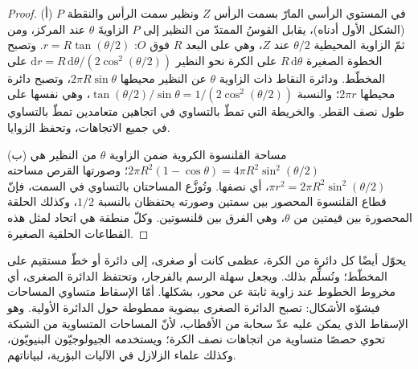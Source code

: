 \begin{proof}
(أ) في المستوي الرأسي المارّ بسمت الرأس $Z$ ونظير سمت الرأس والنقطة $P$
(الشكل الأول أدناه)، يقابل القوسُ الممتدّ من النظير إلى $P$ الزاويةَ $\theta$ عند المركز،
ومن ثمّ الزاوية المحيطية
$\theta/2$ عند $Z$، وهي على البعد $R$ فوق $O$: $r =
R\tan(\theta/2)$. وتصبح الخطوة الصغيرة $R\,\mathrm d\theta$ على الكرة نحو
النظير $\mathrm dr = R\,\mathrm d\theta/(2\cos^2(\theta/2))$ على
المخطّط. ودائرة النقاط ذات الزاوية $\theta$ عن النظير
محيطها $2\pi R\sin\theta$، وتصبح دائرة محيطها $2\pi
r$؛ والنسبة $\tan(\theta/2)/\sin\theta = 1/(2\cos^2(\theta/2))$، وهي نفسها
على طول نصف القطر. والخريطة التي تمطّ بالتساوي في اتجاهين متعامدين
تمطّ بالتساوي في جميع الاتجاهات، وتحفظ الزوايا.

(ب) مساحة القلنسوة الكروية ضمن الزاوية $\theta$ من النظير هي
$2\pi R^2(1 - \cos\theta) = 4\pi R^2\sin^2(\theta/2)$؛ وصورتها القرص
مساحته $\pi r^2 = 2\pi R^2\sin^2(\theta/2)$، أي نصفها. وتُوزَّع المساحتان
بالتساوي في السمت، فإنّ قطاع القلنسوة المحصور بين سمتين
وصورته يحتفظان بالنسبة $1/2$، وكذلك الحلقة المحصورة بين قيمتين
من $\theta$، وهي الفرق بين قلنسوتين. وكلّ منطقة هي اتحاد لمثل
هذه القطاعات الحلقية الصغيرة.
\end{proof}

يحوّل  أيضًا كل دائرة من الكرة، عظمى كانت أو صغرى،
إلى دائرة أو خطّ مستقيم على المخطّط؛ ونُسلِّم بذلك. ويجعل
 سهلة الرسم بالفرجار، وتحتفظ الدائرة الصغرى، أي مخروط
الخطوط عند زاوية ثابتة عن محور، بشكلها. أمّا الإسقاط متساوي المساحات
فيشوّه الأشكال: تصبح الدائرة الصغرى بيضوية
ممطوطة حول الدائرة الأولية. وهو الإسقاط الذي يمكن عليه عدّ سحابة من الأقطاب،
لأنّ المساحات المتساوية من الشبكة تحوي حصصًا متساوية من
اتجاهات نصف الكرة؛ ويستخدمه الجيولوجيّون البنيويّون، وكذلك علماء الزلازل في
الآليات البؤرية، لبياناتهم.

